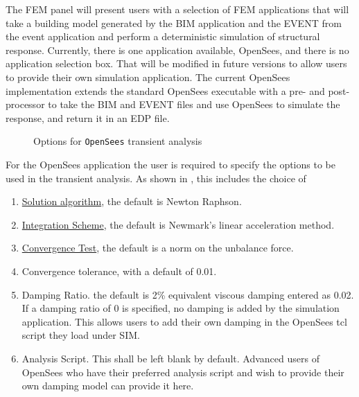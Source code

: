 The FEM panel will present users with a selection of FEM
applications that will take a building model generated by the BIM
application and the EVENT from the event application and perform a
deterministic simulation of structural response. Currently, there is one application
available, OpenSees, and there is no application selection box. That
will be modified in future versions to allow users to provide their own
simulation application. The current OpenSees implementation extends the standard OpenSees executable with a pre- and post-processor to take the BIM and EVENT
files and use OpenSees to simulate the response, and return it in an EDP file.

\begin{figure}[!htbp]
  \caption{Options for \texttt{OpenSees} transient analysis}
  \label{fig:fem}
\end{figure}

For the OpenSees application the user is required to specify the
options to be used in the transient analysis. As shown in ,
this includes the choice of
\begin{enumerate}
\item \href{http://opensees.berkeley.edu/wiki/index.php/Algorithm_Command}{Solution algorithm}, the default is Newton Raphson.
\item \href{http://opensees.berkeley.edu/wiki/index.php/Integrator_Command}{Integration Scheme}, the default is Newmark's linear acceleration
  method.
\item \href{http://opensees.berkeley.edu/wiki/index.php/Test_Command}{Convergence Test}, the default is a norm on the unbalance force.
\item Convergence tolerance, with a default of 0.01.
\item Damping Ratio. the default is 2\% equivalent viscous damping entered as 0.02. If
a damping ratio of 0 is specified, no damping is added by the simulation application. This allows users to add their own damping in the OpenSees tcl script they load under SIM.
\item Analysis Script. This shall be left blank by default. Advanced users of OpenSees who have their preferred analysis script
and wish to provide their own damping model can provide it here.
\end{enumerate}


